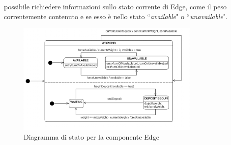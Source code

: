 \documentclass[a4paper, 12pt]{report}
\begin{document}
			possibile richiedere informazioni sullo stato corrente di Edge, come il peso correntemente
			contenuto e se esso è nello stato ``\textit{available}" o ``\textit{unavailable}".\newline
			\begin{figure}[H]
				\centering
				\includegraphics[width=0.8\textwidth]{"img/EdgeStatechart"}    
				\caption{Diagramma di stato per la componente Edge}
			\end{figure}
\end{document}
